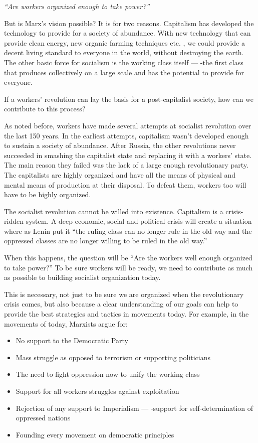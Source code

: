 \emph{“Are workers organized enough to take power?”}

But is Marx’s vision possible? It is for two reasons. Capitalism has developed the technology to provide for a society of abundance. With new technology that can provide clean energy, new organic farming techniques etc. , we could provide a decent living standard to everyone in the world, without destroying the earth. The other basic force for socialism is the working class itself — -the first class that produces collectively on a large scale and has the potential to provide for everyone.

If a workers’ revolution can lay the basis for a post-capitalist society, how can we contribute to this process?

As noted before, workers have made several attempts at socialist revolution over the last 150 years. In the earliest attempts, capitalism wasn’t developed enough to sustain a society of abundance. After Russia, the other revolutions never succeeded in smashing the capitalist state and replacing it with a workers’ state. The main reason they failed was the lack of a large enough revolutionary party. The capitalists are highly organized and have all the means of physical and mental means of production at their disposal. To defeat them, workers too will have to be highly organized.

The socialist revolution cannot be willed into existence. Capitalism is a crisis-ridden system. A deep economic, social and political crisis will create a situation where as Lenin put it “the ruling class can no longer rule in the old way and the oppressed classes are no longer willing to be ruled in the old way.”

When this happens, the question will be “Are the workers well enough organized to take power?” To be sure workers will be ready, we need to contribute as much as possible to building socialist organization today.

This is necessary, not just to be sure we are organized when the revolutionary crisis comes, but also because a clear understanding of our goals can help to provide the best strategies and tactics in movements today. For example, in the movements of today, Marxists argue for:

\begin{itemize}
	\item No support to the Democratic Party
	\item Mass struggle as opposed to terrorism or supporting politicians
	\item The need to fight oppression now to unify the working class
	\item Support for all workers struggles against exploitation
	\item Rejection of any support to Imperialism — -support for self-determination of oppressed nations
	\item Founding every movement on democratic principles
\end{itemize}

